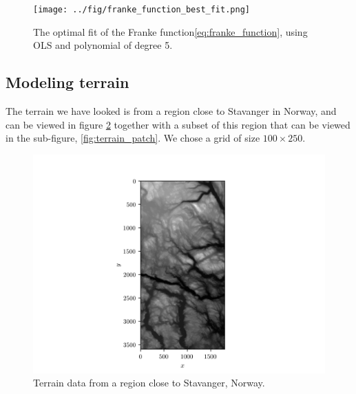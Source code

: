 \documentclass[11pt]{article}
\begin{document}

\begin{figure}[H]
    \centering
    \texttt{[image: ../fig/franke\_function\_best\_fit.png]}
    \caption{The optimal fit of the Franke function\eqref{eq:franke_function}, using OLS and polynomial of degree 5.}
    \label{fig:optimal_fit_franke_func}
\end{figure}


\subsection{Modeling terrain}
The terrain we have looked is from a region close to Stavanger in Norway, and can be viewed in figure \ref{fig:terrain_map_full} together with a subset of this region that can be viewed in the sub-figure, \ref{fig:terrain_patch}. We chose a grid of size $100 \times 250$.

\begin{figure}
    \centering
    \includegraphics[scale=1.0]{../fig/terrain_data.png}
    \caption{Terrain data from a region close to Stavanger, Norway.}
    \label{fig:terrain_map_full}
\end{figure}
\end{document}
